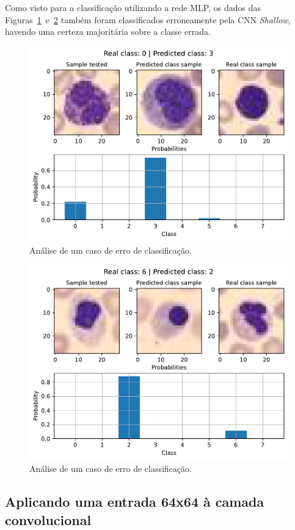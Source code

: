 Como visto para a classificação utilizando a rede MLP, os dados das Figuras~\ref{fig:error_analyser_36_cnn}~e~\ref{fig:error_analyser_62_cnn} também foram classificados erroneamente pela CNN \textit{Shallow}, havendo uma certeza majoritária sobre a classe errada.

\begin{figure}[H]
\centering
\includegraphics[width=0.75\linewidth]{../../plot/cnn_shallow/error_analyser_36}
\caption{Análise de um caso de erro de classificação.}
\label{fig:error_analyser_36_cnn}
\end{figure}

\begin{figure}[H]
\centering
\includegraphics[width=0.75\linewidth]{../../plot/cnn_shallow/error_analyser_62}
\caption{Análise de um caso de erro de classificação.}
\label{fig:error_analyser_62_cnn}
\end{figure}


\subsection{Aplicando uma entrada 64x64 à camada convolucional}

